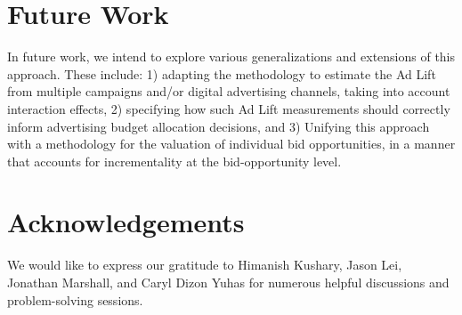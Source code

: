 \documentclass[11pt,a4paper]{article}
\theoremstyle{definition}
\theoremstyle{remark}
\theoremstyle{definition}
\theoremstyle{definition}
\theoremstyle{definition}
\theoremstyle{definition}
\theoremstyle{definition}
\theoremstyle{definition}
\begin{document}
\section{Future Work}\label{sec-future}

In future work, we intend to explore various generalizations and extensions of this approach. These include: 1) adapting the methodology to estimate the Ad Lift from multiple campaigns and/or digital advertising channels, taking into account interaction effects, 2) specifying how such Ad Lift measurements should correctly inform advertising budget allocation decisions, and 3) Unifying this approach with a methodology for the valuation of individual bid opportunities, in a manner that accounts for incrementality at the bid-opportunity level.


\section{Acknowledgements}\label{sec-acknowledge}

We would like to express our gratitude to Himanish Kushary, Jason Lei, Jonathan Marshall,  and Caryl Dizon Yuhas for numerous helpful discussions and problem-solving sessions.

{}


\end{document}
